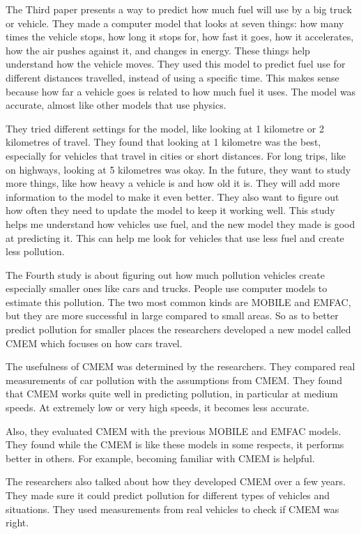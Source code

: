 \documentclass[12pt, a4paper,oneside]{book}
\numberwithin{equation}{section}
\begin{document}
The Third paper presents a way to predict how much fuel will use by a big truck or vehicle. They made a computer model that looks at seven things: how many times the vehicle stops, how long it stops for, how fast it goes, how it accelerates, how the air pushes against it, and changes in energy. These things help understand how the vehicle moves. They used this model to predict fuel use for different distances travelled, instead of using a specific time. This makes sense because how far a vehicle goes is related to how much fuel it uses. The model was accurate, almost like other models that use physics.~\cite{ref6}

They tried different settings for the model, like looking at 1 kilometre or 2 kilometres of travel. They found that looking at 1 kilometre was the best, especially for vehicles that travel in cities or short distances. For long trips, like on highways, looking at 5 kilometres was okay.
In the future, they want to study more things, like how heavy a vehicle is and how old it is. They will add more information to the model to make it even better. They also want to figure out how often they need to update the model to keep it working well. This study helps me understand how vehicles use fuel, and the new model they made is good at predicting it. This can help me look for vehicles that use less fuel and create less pollution.~\cite{ref6}


The Fourth study is about figuring out how much pollution vehicles create especially smaller ones like cars and trucks. People use computer models to estimate this pollution. The two most common kinds are MOBILE and EMFAC, but they are more successful in large compared to small areas. So as to better predict pollution for smaller places  the researchers developed a new model called CMEM which focuses on how cars travel.~\cite{ref7}

The usefulness of CMEM was determined by the researchers. They compared real measurements of car pollution with the assumptions from CMEM. They found that CMEM works quite well in predicting pollution, in particular at medium speeds. At extremely low or very high speeds, it becomes less accurate. ~\cite{ref7}

Also, they evaluated CMEM with the previous MOBILE and EMFAC models. They found while the CMEM is like these models in some respects, it performs better in others. For example, becoming familiar with CMEM is helpful.~\cite{ref7}

The researchers also talked about how they developed CMEM over a few years. They made sure it could predict pollution for different types of vehicles and situations. They used measurements from real vehicles to check if CMEM was right.
\end{document}

